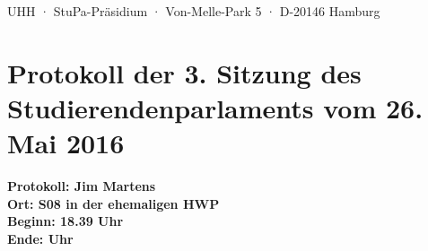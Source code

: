 \documentclass[ngerman,headheight=70pt]{scrartcl}
\begin{document}
    UHH · StuPa-Präsidium · Von-Melle-Park 5 · D-20146 Hamburg

    \section*{Protokoll der 3. Sitzung des Studierendenparlaments vom 26. Mai 2016}

    \textbf{Protokoll: Jim Martens}\\
    \textbf{Ort: S08 in der ehemaligen HWP}\\
    \textbf{Beginn: 18.39 Uhr}\\
    \textbf{Ende: Uhr}

    \vspace{0.5cm}
\end{document}
